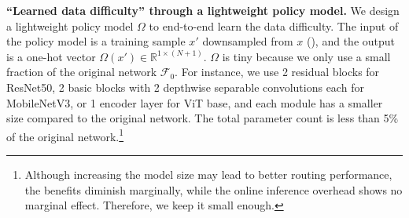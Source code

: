 \noindent \textbf{``Learned data difficulty'' through a lightweight policy model.}
We design a lightweight policy model $\Omega$ to end-to-end learn the data difficulty.
The input of the policy model is a training sample $x'$ downsampled from $x$ (), and the output is a one-hot vector $\Omega(x') \in \mathbb{R}^{1 \times (N+1)}$. 
$\Omega$ is tiny because we only use a small fraction of the original network $\mathcal{F}_{0}$. 
For instance, we use 2 residual blocks for ResNet50, 2 basic blocks with 2 depthwise separable convolutions each for MobileNetV3, or 1 encoder layer for ViT base, and each module has a smaller size compared to the original network. 
The total parameter count is less than 5\% of the original network.\footnote{
Although increasing the model size may lead to better routing performance, the benefits diminish marginally, while the online inference overhead shows no marginal effect. Therefore, we keep it small enough.}

